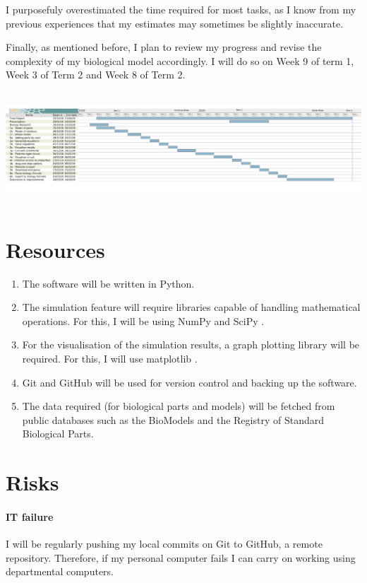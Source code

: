 \documentclass{article}
\begin{document}
	\par I purposefuly overestimated the time required for most tasks, as I know from my previous experiences that my estimates may sometimes be slightly inaccurate.
	
	\par Finally, as mentioned before, I plan to review my progress and revise the complexity of my biological model accordingly. I will do so on Week 9 of term 1, Week 3 of Term 2 and Week 8 of Term 2.
	
	\includegraphics[height=120pt]{timetable}
	
	\section{Resources}
	\begin{enumerate}
		\item The software will be written in Python.
		\item The simulation feature will require libraries capable of handling mathematical operations. For this, I will be using NumPy \cite{numpy} and SciPy \cite{scipy}.
		\item For the visualisation of the simulation results, a graph plotting library will be required. For this, I will use matplotlib \cite{matplotlib}.
		\item Git \cite{git} and GitHub \cite{github} will be used for version control and backing up the software.
		\item The data required (for biological parts and models) will be fetched from public databases such as the BioModels \cite{biomodels} and the Registry of Standard Biological Parts. \cite{rsbp}
	\end{enumerate}
	
	\section{Risks}
	\paragraph{IT failure} I will be regularly pushing my local commits on Git to GitHub, a remote repository. Therefore, if my personal computer fails I can carry on working using departmental computers.
\end{document}

